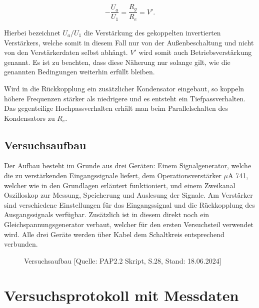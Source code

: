 \documentclass{article}
\begin{document}
\begin{equation}
    - \frac{U_a}{U_1} = \frac{R_g}{R_e} = V'.
    \label{eq:Betriebsverstärkung}
\end{equation}

Hierbei bezeichnet $U_a/U_1$ die Verstärkung des gekoppelten invertierten Verstärkers, welche somit in diesem Fall nur von der Außenbeschaltung und nicht von den Verstärkerdaten selbst abhängt. $V'$ wird somit auch Betriebsverstärkung genannt. Es ist zu beachten, dass diese Näherung nur solange gilt, wie die genannten Bedingungen weiterhin erfüllt bleiben. 

Wird in die Rückkopplung ein zusätzlicher Kondensator eingebaut, so koppeln höhere Frequenzen stärker als niedrigere und es entsteht ein Tiefpassverhalten. Das gegenteilige Hochpassverhalten erhält man beim Parallelschalten des Kondensators zu $R_e$.

\newpage
\subsection{Versuchsaufbau}

Der Aufbau besteht im Grunde aus drei Geräten: Einem Signalgenerator, welche die zu verstärkenden Eingangssignale liefert, dem Operationsverstärker $\mu$A 741, welcher wie in den Grundlagen erläutert funktioniert, und einem Zweikanal Oszilloskop zur Messung, Speicherung und Auslesung der Signale. Am Verstärker sind verschiedene Einstellungen für das Eingangssignal und die Rückkopplung des Ausgangssignals verfügbar. Zusätzlich ist in diesem direkt noch ein Gleichspannungsgenerator verbaut, welcher für den ersten Versuchsteil verwendet wird. Alle drei Geräte werden über Kabel dem Schaltkreis entsprechend verbunden.


\phantom{.}

\begin{figure}[!h]
    \centering
    \caption{Versuchsaufbau [Quelle: PAP2.2 Skript, S.28, Stand: 18.06.2024]}
    \label{fig:Aufbau}
\end{figure}




\newpage

\section{Versuchsprotokoll mit Messdaten}
\end{document}
